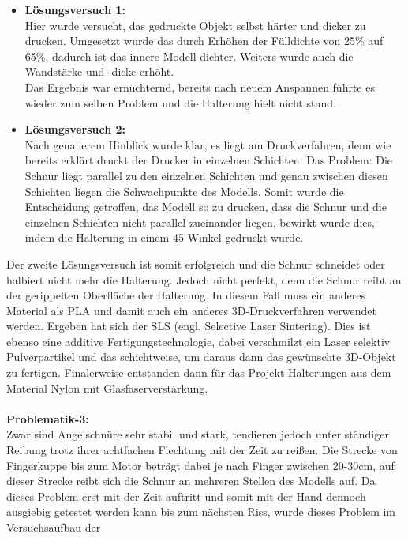 \documentclass[titlepage,12pt,twoside]{article}
\begin{document}
\begin{itemize}
	\item \textbf{Lösungsversuch 1:} \\
	Hier wurde versucht, das gedruckte Objekt selbst härter und dicker zu drucken. Umgesetzt wurde das durch Erhöhen der Fülldichte von 25\% auf 65\%, dadurch ist das innere Modell dichter. Weiters wurde auch die Wandstärke 
	und -dicke erhöht. \\
	Das Ergebnis war ernüchternd, bereits nach neuem Anspannen führte es wieder zum selben Problem und die Halterung hielt nicht stand.
	\item \textbf{Lösungsversuch 2:} \\
	Nach genauerem Hinblick wurde klar, es liegt am Druckverfahren, denn wie bereits erklärt druckt der Drucker in einzelnen Schichten. Das Problem: Die Schnur liegt parallel zu den einzelnen Schichten und genau zwischen diesen Schichten 
	liegen die Schwachpunkte des Modells. Somit wurde die Entscheidung getroffen, das Modell so zu drucken, dass die Schnur und die einzelnen Schichten nicht parallel zueinander liegen, bewirkt wurde dies, indem die Halterung in einem 45\textdegree 
	Winkel gedruckt wurde.
\end{itemize}
\hfill \break
Der zweite Lösungsversuch ist somit erfolgreich und die Schnur schneidet oder halbiert nicht mehr die Halterung. Jedoch nicht perfekt, denn die Schnur reibt an der gerippelten Oberfläche der Halterung. In diesem Fall muss ein anderes Material als 
PLA und damit auch ein anderes 3D-Druckverfahren verwendet werden. Ergeben hat sich der SLS (engl. Selective Laser Sintering). Dies ist ebenso eine additive Fertigungstechnologie, dabei verschmilzt ein Laser selektiv Pulverpartikel und das 
schichtweise, um daraus dann das gewünschte 3D-Objekt zu fertigen. Finalerweise entstanden dann für das Projekt Halterungen aus dem Material Nylon mit Glasfaserverstärkung. \\ %
\\
\textbf{Problematik-3:} \\
Zwar sind Angelschnüre sehr stabil und stark, tendieren jedoch unter ständiger Reibung trotz ihrer achtfachen Flechtung mit der Zeit zu reißen. Die Strecke von Fingerkuppe bis zum Motor beträgt dabei je nach Finger zwischen 20-30cm, 
auf dieser Strecke reibt sich die Schnur an mehreren Stellen des Modells auf. Da dieses Problem erst mit der Zeit auftritt und somit mit der Hand dennoch ausgiebig getestet werden kann bis zum nächsten Riss, wurde dieses Problem im Versuchsaufbau der 
\end{document}
